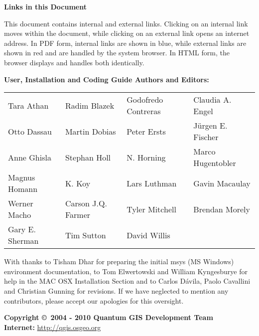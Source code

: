 \textbf{Links in this Document}

This document contains internal and external links.  Clicking on an
internal link moves within the document, while clicking on an external link
opens an internet address.  In PDF form, internal links are shown in blue,
while external links are shown in red and are handled by the
system browser. In HTML form, the browser displays and handles both
identically. 

\begin{flushleft}
\textbf{User, Installation and Coding Guide Authors and Editors:}
 
\begin{tabular}{p{4cm} p{4cm} p{4cm} p{4cm}}
Tara Athan & Radim Blazek & Godofredo Contreras & Claudia A. Engel \\
Otto Dassau & Martin Dobias & Peter Ersts & J\"urgen E. Fischer \\
Anne Ghisla & Stephan Holl & N. Horning & Marco Hugentobler  \\
Magnus Homann & K. Koy & Lars Luthman & Gavin Macaulay\\ 
Werner Macho & Carson J.Q. Farmer & Tyler Mitchell & Brendan Morely\\
Gary E. Sherman & Tim Sutton & David Willis \\
\end{tabular}

\vspace{0.8cm}

With thanks to Tisham Dhar for preparing the initial msys (MS Windows)
environment documentation, to Tom Elwertowski and William Kyngesburye for
help in the MAC OSX Installation Section and to Carlos D\'{a}vila, Paolo
Cavallini and Christian Gunning for revisions. If we have neglected to 
mention any contributors, please accept our apologies for this oversight.

\textbf{Copyright \copyright~2004 - 2010 Quantum GIS Development Team} \\
\textbf{Internet:} \url{http://qgis.osgeo.org}
\end{flushleft}

